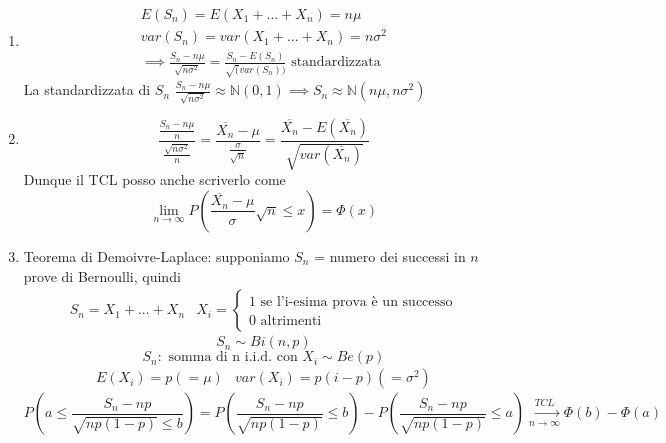 \documentclass{article}
\begin{document}
	\begin{enumerate}
		\item \begin{align}
				E(S_n) = E(X_1+...+X_n) = n\mu\\
				var(S_n) = var(X_1+...+X_n) = n\sigma^2\\
				\implies \frac{S_n - n\mu}{\sqrt{n\sigma^2}} = \frac{S_n - E(S_n)}{\sqrt(var(S_n))} \text{ standardizzata}
			\end{align}
			La standardizzata di $S_n$ $\frac{S_n - n\mu}{\sqrt{n\sigma^2}} \approx \mathbb{N}(0,1) \implies S_n \approx \mathbb{N}(n\mu, n\sigma^2)$
		\item \begin{equation}
				\frac{\frac{S_n - n\mu}{n}}{\frac{\sqrt{n\sigma^2}}{n}} = \frac{\overline{X_n}-\mu}{\frac{\sigma}{\sqrt{n}}} = \frac{\overline{X_n}-E(\overline{X_n})}{\sqrt{var(\overline{X_n})}}
			\end{equation}
			Dunque il TCL posso anche scriverlo come
			\begin{equation}
				\lim\limits_{n\to\infty} P\left(\frac{\overline{X_n}-\mu}{\sigma}\sqrt{n} \leq x\right) = \Phi(x)
			\end{equation}
		\item Teorema di Demoivre-Laplace: supponiamo $S_n$ = numero dei successi in $n$ prove di Bernoulli, quindi
		\begin{align}
			S_n = X_1+...+X_n & X_i =
			\begin{cases}
				1 \text{ se l'i-esima prova è un successo}\\
				0 \text{ altrimenti}
			\end{cases}
		\end{align}
		\begin{equation*}
			S_n \sim Bi(n, p)
		\end{equation*}
		\begin{equation*}
			S_n: \text{ somma di n i.i.d. con } X_i \sim Be(p)
		\end{equation*}
		\begin{align*}
			E(X_i)=p (=\mu) & var(X_i) = p(i-p) (=\sigma^2)
		\end{align*}
		\begin{equation}
			P\left(a \leq \frac{S_n-np}{\sqrt{np(1-p)} \leq b}\right) = P\left(\frac{S_n-np}{\sqrt{np(1-p)}} \leq b\right) - P\left(\frac{S_n-np}{\sqrt{np(1-p)}} \leq a\right) \xrightarrow[n\to\infty]{TCL} \Phi(b) - \Phi(a)
		\end{equation}
	\end{enumerate}
\end{document}
